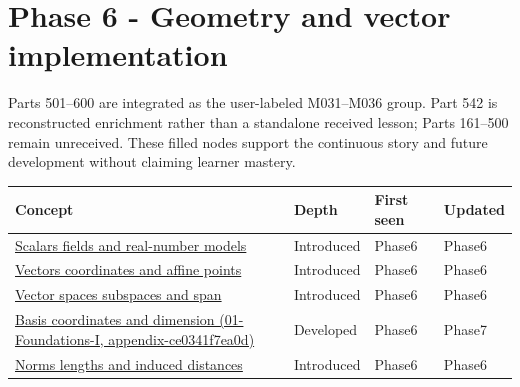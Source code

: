 \section{Phase 6 - Geometry and vector implementation}\label{appendix-a6d556a4ef50-phase-6---geometry-and-vector-implementation}

Parts 501--600 are integrated as the user-labeled M031--M036 group. Part 542 is reconstructed enrichment rather than a standalone received lesson; Parts 161--500 remain unreceived. These filled nodes support the continuous story and future development without claiming learner mastery.

{\def\LTcaptype{none} %
\begin{longtable}[]{@{}
  >{\raggedright\arraybackslash}p{}
  >{\raggedright\arraybackslash}p{}
  >{\raggedright\arraybackslash}p{}
  >{\raggedright\arraybackslash}p{}@{}}
\toprule\noalign{}
\begin{minipage}[b]{\linewidth}\raggedright
Concept
\end{minipage} & \begin{minipage}[b]{\linewidth}\raggedright
Depth
\end{minipage} & \begin{minipage}[b]{\linewidth}\raggedright
First seen
\end{minipage} & \begin{minipage}[b]{\linewidth}\raggedright
Updated
\end{minipage} \\
\midrule\noalign{}
\endhead
\bottomrule\noalign{}
\endlastfoot
\hyperref[appendix-52051ad550fe]{Scalars fields and real-number models} & Introduced & Phase6 & Phase6 \\
\hyperref[appendix-0659864c0aa3]{Vectors coordinates and affine points} & Introduced & Phase6 & Phase6 \\
\hyperref[appendix-173b52c063ae]{Vector spaces subspaces and span} & Introduced & Phase6 & Phase6 \\
\href{../01-Foundations-I/main.pdf\#nameddest=appendix-ce0341f7ea0d}{Basis coordinates and dimension (01-Foundations-I, appendix-ce0341f7ea0d)} & Developed & Phase6 & Phase7 \\
\hyperref[appendix-49933872bb51]{Norms lengths and induced distances} & Introduced & Phase6 & Phase6 \\

\end{longtable}}
